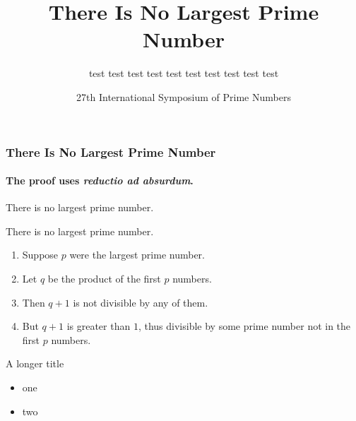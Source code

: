 \documentclass[aspectratio=169]{beamer}
\title{There Is No Largest Prime Number}
\date[ISPN ’80]{27th International Symposium of Prime Numbers}
\author[Euclid]{test test test test test test test test test test}
\begin{document}
\begin{frame}
\titlepage
\end{frame}


\begin{frame}
\frametitle{There Is No Largest Prime Number}
\framesubtitle{The proof uses \textit{reductio ad absurdum}.}
\begin{theorem}[test]
There is no largest prime number. \end{theorem}
\begin{theorem}[test]
There is no largest prime number. \end{theorem}
\begin{enumerate}
\item<1-| alert@1> Suppose $p$ were the largest prime number.
\item<2-> Let $q$ be the product of the first $p$ numbers.
\item<3-> Then $q+1$ is not divisible by any of them.
\item<1-> But $q + 1$ is greater than $1$, thus divisible by some prime
number not in the first $p$ numbers.
\end{enumerate}
\end{frame}

\begin{frame}{A longer title}
\begin{itemize}
\item one
\item two
\end{itemize}
\end{frame}
\end{document}
